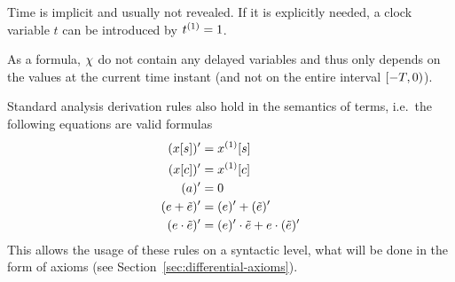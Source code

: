    Time is implicit and usually not revealed. If it is explicitly needed, a clock variable $t$ can be introduced by $\hevolve{\D{t}=1}$.



    As a \FOLR formula, $\chi$ do not contain any delayed variables and thus only depends on the values at the current time instant (and not on the entire interval $[-T,0)$).

    \begin{lemma}[Derivatives]\label{lm:derivatives}
        Standard analysis derivation rules also hold in the semantics of \ddL terms, i.e.\ the following equations are valid \ddL formulas
        \begin{align}
            \der{\x[s]} &= \Dx[s]\\
            \der{\x[c]} &= \Dx[c]\\
            \der{a} &= 0\\
            \der{\astrm+\bstrm} &= \der{\astrm}+\der{\bstrm}\\
            \der{\astrm\cdot\bstrm} &= \der{\astrm}\cdot\bstrm + \astrm\cdot\der{\bstrm}\\
        \end{align}
        This allows the usage of these rules on a syntactic level, what will be done in the form of axioms (see Section~\ref{sec:differential-axioms}).
    \end{lemma}
